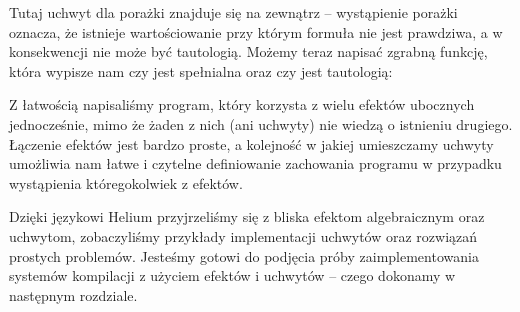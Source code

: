 

Tutaj uchwyt dla porażki znajduje się na zewnątrz -- wystąpienie porażki oznacza, że istnieje wartościowanie przy którym formuła nie jest prawdziwa, a w konsekwencji nie może być tautologią. Możemy teraz napisać zgrabną funkcję, która wypisze nam czy  jest spełnialna oraz czy jest tautologią:



Z łatwością napisaliśmy program, który korzysta z wielu efektów ubocznych jednocześnie, mimo że żaden z nich (ani uchwyty) nie wiedzą o istnieniu drugiego. Łączenie efektów jest bardzo proste, a kolejność w jakiej umieszczamy uchwyty umożliwia nam łatwe i czytelne definiowanie zachowania programu w przypadku wystąpienia któregokolwiek z efektów.

Dzięki językowi Helium przyjrzeliśmy się z bliska efektom algebraicznym oraz uchwytom, zobaczyliśmy przykłady implementacji uchwytów oraz rozwiązań prostych problemów. Jesteśmy gotowi do podjęcia próby zaimplementowania systemów kompilacji z użyciem efektów i uchwytów -- czego dokonamy w następnym rozdziale.

\undef\inl
